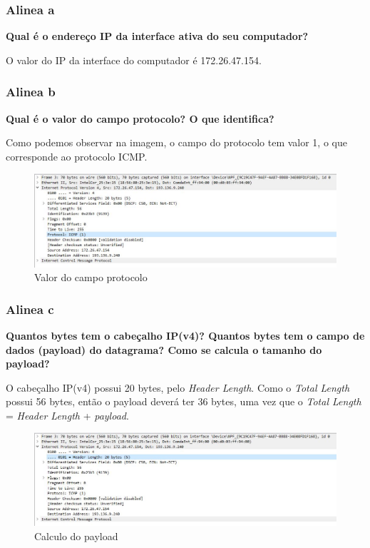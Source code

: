 \documentclass{article}
\begin{document}
\subsubsection{Alinea a}
\textbf{Qual é o endereço IP da interface ativa do seu computador?} \\\par
O valor do IP da interface do computador é 172.26.47.154.\\

\subsubsection{Alinea b}
\textbf{Qual é o valor do campo protocolo? O que identifica?} \\\par
Como podemos observar na imagem, o campo do protocolo tem valor 1, o que corresponde ao protocolo ICMP. \\

\begin{figure}[h]
	\centering
	\includegraphics[scale = 0.5]{valor-campo-protocolo.JPG}
	\caption{Valor do campo protocolo}
\end{figure}

\subsubsection{Alinea c}
\textbf{Quantos bytes tem o cabeçalho IP(v4)? Quantos bytes tem o campo de dados (payload) do datagrama? Como se calcula o tamanho do payload?} \\\par
O cabeçalho IP(v4) possui 20 bytes, pelo \textit{Header Length}. Como o \textit{Total Length} possui 56 bytes, então o {payload} deverá ter 36 bytes, uma vez que o \textit{Total Length} = \textit{Header Length} + \textit{payload}.\\

\begin{figure}[h]
	\centering
	\includegraphics[scale = 0.5]{calculo-payload.JPG}
	\caption{Calculo do payload}
\end{figure}
\end{document}
